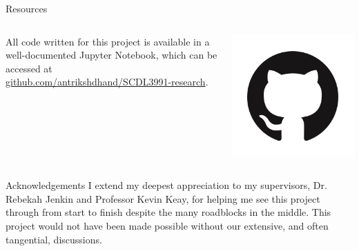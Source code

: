 \documentclass[]{beamer}
\begin{document}
\begin{frame}{Resources}
	\begin{columns}
		\begin{column}{0.7\textwidth}
			All code written for this project is available in a well-documented Jupyter Notebook, which can be accessed at \textcolor{cyan}{\href{https://github.com/antrikshdhand/SCDL3991-research}{github.com/antrikshdhand/SCDL3991-research}}.
		\end{column}
		\begin{column}{0.3\textwidth}
			\centering
			\includegraphics[width=\textwidth]{img/github.png}
		\end{column}
	\end{columns}
\end{frame}

\begin{frame}{Acknowledgements}
	I extend my deepest appreciation to my supervisors, Dr. Rebekah Jenkin and Professor Kevin Keay, for helping me see this project through from start to finish despite the many roadblocks in the middle. This project would not have been made possible without our extensive, and often tangential, discussions. 
\end{frame}
\end{document}
